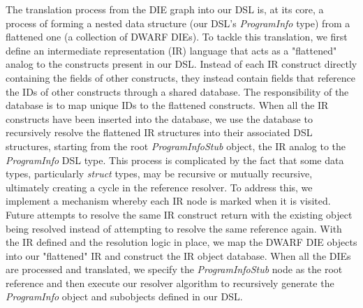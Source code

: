 The translation process from the DIE graph into our DSL is, at its core, a process of forming a nested data structure (our DSL's \emph{ProgramInfo} type) from a flattened one (a collection of DWARF DIEs). To tackle this translation, we first define an intermediate representation (IR) language that acts as a "flattened" analog to the constructs present in our DSL. Instead of each IR construct directly containing the fields of other constructs, they instead contain fields that reference the IDs of other constructs through a shared database. The responsibility of the database is to map unique IDs to the flattened constructs. When all the IR constructs have been inserted into the database, we use the database to recursively resolve the flattened IR structures into their associated DSL structures, starting from the root \emph{ProgramInfoStub} object, the IR analog to the \emph{ProgramInfo} DSL type. This process is complicated by the fact that some data types, particularly \emph{struct} types, may be recursive or mutually recursive, ultimately creating a cycle in the reference resolver. To address this, we implement a mechanism whereby each IR node is marked when it is visited. Future attempts to resolve the same IR construct return with the existing object being resolved instead of attempting to resolve the same reference again. With the IR defined and the resolution logic in place, we map the DWARF DIE objects into our "flattened" IR and construct the IR object database. When all the DIEs are processed and translated, we specify the \emph{ProgramInfoStub} node as the root reference and then execute our resolver algorithm to recursively generate the \emph{ProgramInfo} object and subobjects defined in our DSL.

